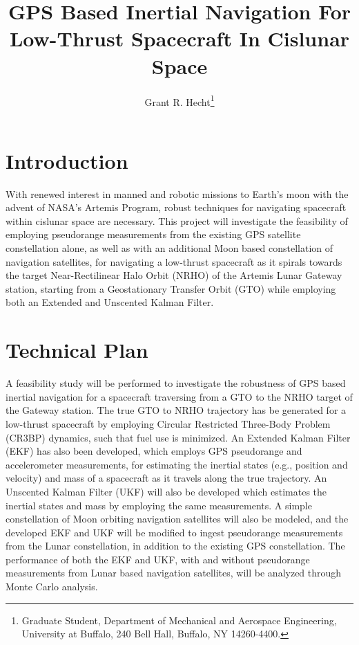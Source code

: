 \documentclass[letterpaper, submit]{AAS}			%
\begin{document}
\title{GPS Based Inertial Navigation For Low-Thrust Spacecraft In Cislunar Space}

\author{Grant R. Hecht\thanks{Graduate Student, Department of Mechanical and Aerospace Engineering, University at Buffalo, 240 Bell Hall, Buffalo, NY  14260-4400.}}

\maketitle{} 		

\section{Introduction}
With renewed interest in manned and robotic missions to Earth's moon with the advent of NASA's Artemis Program, robust techniques for navigating spacecraft within cislunar space are necessary. This project will investigate the feasibility of employing pseudorange measurements from the existing GPS satellite constellation alone, as well as with an additional Moon based constellation of navigation satellites, for navigating a low-thrust spacecraft as it spirals towards the target Near-Rectilinear Halo Orbit (NRHO) of the Artemis Lunar Gateway station, starting from a Geostationary Transfer Orbit (GTO) while employing both an Extended and Unscented Kalman Filter. 

\section{Technical Plan}
A feasibility study will be performed to investigate the robustness of GPS based inertial navigation for a spacecraft traversing from a GTO to the NRHO target of the Gateway station. The true GTO to NRHO trajectory has be generated for a low-thrust spacecraft by employing Circular Restricted Three-Body Problem (CR3BP) dynamics, such that fuel use is minimized. An Extended Kalman Filter (EKF) has also been developed, which employs GPS pseudorange and accelerometer measurements, for estimating the inertial states (e.g., position and velocity) and mass of a spacecraft as it travels along the true trajectory. An Unscented Kalman Filter (UKF) will also be developed which estimates the inertial states and mass by employing the same measurements. A simple constellation of Moon orbiting navigation satellites will also be modeled, and the developed EKF and UKF will be modified to ingest pseudorange measurements from the Lunar constellation, in addition to the existing GPS constellation. The performance of both the EKF and UKF, with and without pseudorange measurements from Lunar based navigation satellites, will be analyzed through Monte Carlo analysis.
\end{document}
